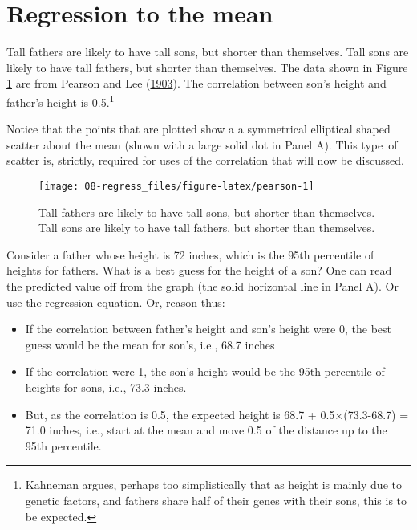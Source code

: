 \documentclass[
  10ptls,
  b5paper]{book}
\providecommand{\tightlist}{%
  \setlength{\itemsep}{0pt}\setlength{\parskip}{0pt}}
\begin{document}
\hypertarget{regression-to-the-mean}{%
\section{Regression to the mean}\label{regression-to-the-mean}}

Tall fathers are likely to have tall sons, but shorter than themselves. Tall sons are likely to have tall fathers, but shorter than themselves. The data shown in Figure \ref{fig:pearson} are from Pearson and Lee (\protect\hyperlink{ref-pearson1903laws}{1903}). The correlation between son's height and father's height is 0.5.\footnote{Kahneman argues, perhaps too simplistically that as height is mainly due to genetic factors, and fathers share half of their genes with their sons, this is to be expected.}

Notice that the points that are plotted show a a symmetrical elliptical shaped scatter about the mean (shown with a large solid dot in Panel A). This type~of scatter is, strictly, required for uses of the correlation that will now be discussed.

\begin{figure}[H]

{\centering \texttt{[image: 08-regress\_files/figure-latex/pearson-1]} 

}

\caption{Tall fathers are likely to have tall sons, but shorter than themselves. 
Tall sons are likely to have tall fathers, but shorter than themselves.}\label{fig:pearson}
\end{figure}

Consider a father whose height is 72 inches, which is the 95th percentile of heights for fathers. What is a best guess for the height of a son? One can read the predicted value off from the graph (the solid horizontal line in Panel A). Or use the regression equation. Or, reason thus:

\begin{itemize}
\tightlist
\item
  If the correlation between father's height and son's height were 0, the best guess would be the mean for son's, i.e., 68.7 inches
\item
  If the correlation were 1, the son's height would be the 95th percentile of heights for sons, i.e., 73.3 inches.
\item
  But, as the correlation is 0.5, the expected height is 68.7 + 0.5\(\times\)(73.3-68.7) = 71.0 inches, i.e., start at the mean and move 0.5 of the distance up to the 95th percentile.
\end{itemize}
\end{document}
